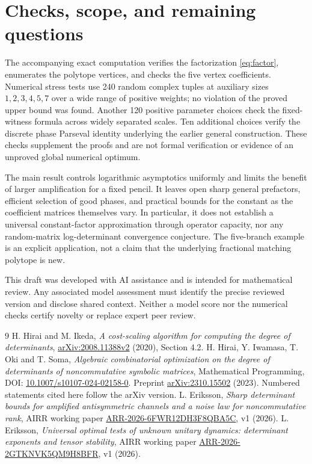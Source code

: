 \documentclass[11pt]{article}
\begin{document}
\section{Checks, scope, and remaining questions}
The accompanying exact computation verifies the factorization \eqref{eq:factor}, enumerates the polytope vertices, and checks the five vertex coefficients. Numerical stress tests use 240 random complex tuples at auxiliary sizes $1,2,3,4,5,7$ over a wide range of positive weights; no violation of the proved upper bound was found. Another 120 positive parameter choices check the fixed-witness formula across widely separated scales. Ten additional choices verify the discrete phase Parseval identity underlying the earlier general construction. These checks supplement the proofs and are not formal verification or evidence of an unproved global numerical optimum.

The main result controls logarithmic asymptotics uniformly and limits the benefit of larger amplification for a fixed pencil. It leaves open sharp general prefactors, efficient selection of good phases, and practical bounds for the constant as the coefficient matrices themselves vary. In particular, it does not establish a universal constant-factor approximation through operator capacity, nor any random-matrix log-determinant convergence conjecture. The five-branch example is an explicit application, not a claim that the underlying fractional matching polytope is new.

This draft was developed with AI assistance and is intended for mathematical review. Any associated model assessment must identify the precise reviewed version and disclose shared context. Neither a model score nor the numerical checks certify novelty or replace expert peer review.

\begin{thebibliography}{9}
 H. Hirai and M. Ikeda, \emph{A cost-scaling algorithm for computing the degree of determinants}, \href{https://arxiv.org/abs/2008.11388v2}{arXiv:2008.11388v2} (2020), Section 4.2.
 H. Hirai, Y. Iwamasa, T. Oki and T. Soma, \emph{Algebraic combinatorial optimization on the degree of determinants of noncommutative symbolic matrices}, Mathematical Programming, DOI: \href{https://doi.org/10.1007/s10107-024-02158-0}{10.1007/s10107-024-02158-0}. Preprint \href{https://arxiv.org/abs/2310.15502}{arXiv:2310.15502} (2023). Numbered statements cited here follow the arXiv version.
 L. Eriksson, \emph{Sharp determinant bounds for amplified antisymmetric channels and a noise law for noncommutative rank}, AIRR working paper \href{https://airr.science/papers/ARR-2026-6FWR12DH3F8QBA5C/versions/v1/}{ARR-2026-6FWR12DH3F8QBA5C}, v1 (2026).
 L. Eriksson, \emph{Universal optimal tests of unknown unitary dynamics: determinant exponents and tensor stability}, AIRR working paper \href{https://airr.science/papers/ARR-2026-2GTKNVK5QM9H8BFR/versions/v1/}{ARR-2026-2GTKNVK5QM9H8BFR}, v1 (2026).
\end{thebibliography}
\end{document}
